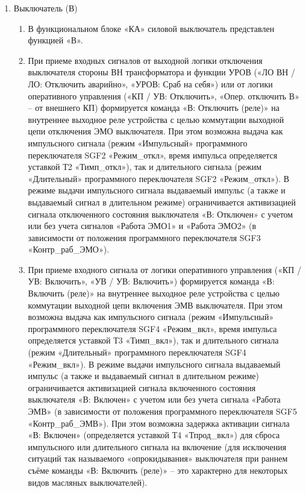 \begin{enumerate}
\begin{enumerate}
\end{enumerate}
\FloatBarrier %

\item Выключатель (В)

\begin{enumerate}

\item
В функциональном блоке «КА» силовой выключатель представлен функцией «В».

\item
При приеме входных сигналов от выходной логики отключения выключателя стороны ВН трансформатора и функции УРОВ («ЛО ВН / ЛО: Отключить аварийно», «УРОВ: Сраб на себя») или от логики оперативного управления («КП / УВ: Отключить», «Опер. отключить В» -- от внешнего КП) формируется команда «В: Отключить (реле)» на внутреннее выходное реле устройства с целью коммутации выходной цепи отключения ЭМО выключателя. При этом возможна выдача как импульсного сигнала (режим «Импульсный» программного переключателя SGF2 «Режим\_откл», время импульса определяется уставкой Т2 «Тимп\_откл»), так и длительного сигнала (режим «Длительный» программного переключателя SGF2 «Режим\_откл»). 
В режиме выдачи импульсного сигнала выдаваемый импульс (а также и выдаваемый сигнал в длительном режиме) ограничивается активизацией сигнала отключенного состояния выключателя «В: Отключен» с учетом или без учета сигналов «Работа ЭМО1» и «Работа ЭМО2» (в зависимости от положения программного переключателя SGF3 «Контр\_раб\_ЭМО»).
\item
При приеме входного сигнала от логики оперативного управления («КП / УВ: Включить», «УВ / УВ: Включить») формируется команда «В: Включить (реле)» на внутреннее выходное реле устройства с целью коммутации выходной цепи включения ЭМВ выключателя. При этом возможна выдача как импульсного сигнала (режим «Импульсный» программного переключателя SGF4 «Режим\_вкл», время импульса определяется уставкой Т3 «Тимп\_вкл»), так и длительного сигнала (режим «Длительный» программного переключателя SGF4 «Режим\_вкл»).
В режиме выдачи импульсного сигнала выдаваемый импульс (а также и выдаваемый сигнал в длительном режиме) ограничивается активизацией сигнала включенного состояния выключателя «В: Включен» с учетом или без учета сигнала «Работа ЭМВ» (в зависимости от положения программного переключателя SGF5 «Контр\_раб\_ЭМВ»). При этом возможна задержка активации сигнала «В: Включен» (определяется уставкой Т4 «Тпрод\_вкл») для сброса импульсного или длительного сигнала на включение (для исключения ситуаций так называемого «опрокидывания» выключателя при раннем съёме команды «В: Включить (реле)» -- это характерно для некоторых видов масляных выключателей).

\end{enumerate}
\end{enumerate}
